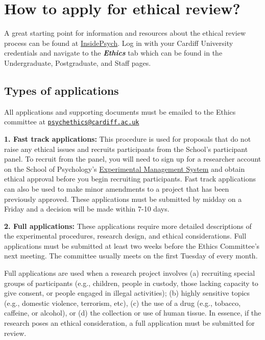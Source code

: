 \documentclass[12pt,]{book}
\theoremstyle{definition}
\theoremstyle{definition}
\theoremstyle{definition}
\theoremstyle{remark}
\begin{document}
\section{How to apply for ethical
review?}\label{how-to-apply-for-ethical-review}

A great starting point for information and resources about the ethical
review process can be found at
\href{https://inside.psych.cf.ac.uk/}{InsidePsych}. Log in with your
Cardiff University credentials and navigate to the
\emph{\textbf{Ethics}} tab which can be found in the Undergraduate,
Postgraduate, and Staff pages.

\subsection{Types of applications}\label{types-of-applications}

All applications and supporting documents must be emailed to the Ethics
committee at
\href{mailto:psychethics@cardiff.ac.uk}{\nolinkurl{psychethics@cardiff.ac.uk}}

\textbf{1. Fast track applications:} This procedure is used for
proposals that do not raise any ethical issues and recruits participants
from the School's participant panel. To recruit from the panel, you will
need to sign up for a researcher account on the School of Psychology's
\href{https://cardiff.sona-systems.com/Default.aspx?ReturnUrl=/}{Experimental
Management System} and obtain ethical approval before you begin
recruiting participants. Fast track applications can also be used to
make minor amendments to a project that has been previously approved.
These applications must be submitted by midday on a Friday and a
decision will be made within 7-10 days.

\textbf{2. Full applications:} These applications require more detailed
descriptions of the experimental procedures, research design, and
ethical considerations. Full applications must be submitted at least two
weeks before the Ethics Committee's next meeting. The committee usually
meets on the first Tuesday of every month.

Full applications are used when a research project involves (a)
recruiting special groups of participants (e.g., children, people in
custody, those lacking capacity to give consent, or people engaged in
illegal activities); (b) highly sensitive topics (e.g., domestic
violence, terrorism, etc), (c) the use of a drug (e.g., tobacco,
caffeine, or alcohol), or (d) the collection or use of human tissue. In
essence, if the research poses an ethical consideration, a full
application must be submitted for review.
\end{document}
